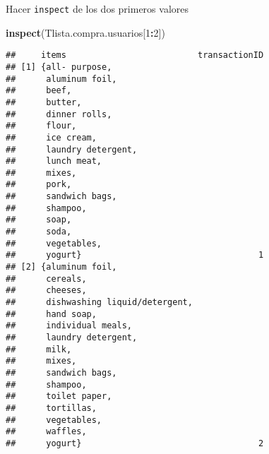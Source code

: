 \documentclass[
  ignorenonframetext,
]{beamer}
\newenvironment{Shaded}{\begin{snugshade}}{\end{snugshade}}
\newcommand{\DecValTok}[1]{\textcolor[rgb]{0.00,0.00,0.81}{#1}}
\newcommand{\KeywordTok}[1]{\textcolor[rgb]{0.13,0.29,0.53}{\textbf{#1}}}
\newcommand{\NormalTok}[1]{#1}
\newcommand{\OperatorTok}[1]{\textcolor[rgb]{0.81,0.36,0.00}{\textbf{#1}}}
\begin{document}
\begin{frame}[fragile]{Hacer \texttt{inspect} de los dos primeros
valores}
\protect\hypertarget{hacer-inspect-de-los-dos-primeros-valores}{}

\begin{Shaded}
\begin{Highlighting}[]
\KeywordTok{inspect}\NormalTok{(Tlista.compra.usuarios[}\DecValTok{1}\OperatorTok{:}\DecValTok{2}\NormalTok{])}
\end{Highlighting}
\end{Shaded}

\begin{verbatim}
##     items                          transactionID
## [1] {all- purpose,                              
##      aluminum foil,                             
##      beef,                                      
##      butter,                                    
##      dinner rolls,                              
##      flour,                                     
##      ice cream,                                 
##      laundry detergent,                         
##      lunch meat,                                
##      mixes,                                     
##      pork,                                      
##      sandwich bags,                             
##      shampoo,                                   
##      soap,                                      
##      soda,                                      
##      vegetables,                                
##      yogurt}                                   1
## [2] {aluminum foil,                             
##      cereals,                                   
##      cheeses,                                   
##      dishwashing liquid/detergent,              
##      hand soap,                                 
##      individual meals,                          
##      laundry detergent,                         
##      milk,                                      
##      mixes,                                     
##      sandwich bags,                             
##      shampoo,                                   
##      toilet paper,                              
##      tortillas,                                 
##      vegetables,                                
##      waffles,                                   
##      yogurt}                                   2
\end{verbatim}

\end{frame}
\end{document}
